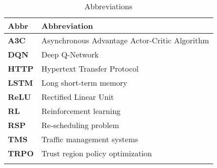 \begin{longtable}{|m{3cm}|m{11cm}|}\hline	
	\rowcolor{gray} \textbf{Abbr}&
	Abbreviation \\ \hline

	\textbf{A3C}&
	Asynchronous Advantage Actor-Critic Algorithm \\ \hline

	\textbf{DQN}&
	Deep Q-Network \\ \hline

	\textbf{HTTP}&
	Hypertext Transfer Protocol \\ 
	\hline

	\textbf{LSTM}&
	Long short-term memory \\ 
	\hline

	\textbf{ReLU}&
	Rectified Linear Unit \\
	\hline

	\textbf{RL}&
	Reinforcement learning \\ 
	\hline

	\textbf{RSP}&
	Re-scheduling problem \\ 
	\hline

	\textbf{TMS}&
	Traffic management systems \\ 
	\hline

	\textbf{TRPO}&
	Trust region policy optimization \\ 
	\hline

\caption{Abbreviations}
\label{tab:abkuerzungsverzeichnis}
\end{longtable}
